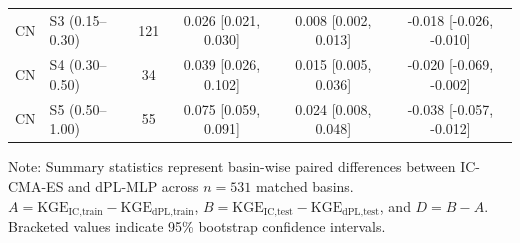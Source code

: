 \begin{table}[t]
\begin{threeparttable}
\begin{tabular}{llcccc}
CN & S3 (0.15–0.30) & 121 & 0.026 [0.021, 0.030] & 0.008 [0.002, 0.013] & -0.018 [-0.026, -0.010] \\
CN & S4 (0.30–0.50) & 34 & 0.039 [0.026, 0.102] & 0.015 [0.005, 0.036] & -0.020 [-0.069, -0.002] \\
CN & S5 (0.50–1.00) & 55 & 0.075 [0.059, 0.091] & 0.024 [0.008, 0.048] & -0.038 [-0.057, -0.012] \\
\bottomrule
\end{tabular}
\begin{tablenotes}
\small
\item Note: Summary statistics represent basin-wise paired differences between IC-CMA-ES and dPL-MLP across $n = 531$ matched basins. $A = \text{KGE}_{\text{IC,train}} - \text{KGE}_{\text{dPL,train}}$, $B = \text{KGE}_{\text{IC,test}} - \text{KGE}_{\text{dPL,test}}$, and $D = B - A$. Bracketed values indicate 95\% bootstrap confidence intervals.
\end{tablenotes}
\end{threeparttable}
\end{table}
